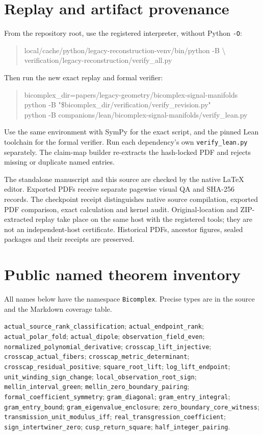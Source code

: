 \documentclass[11pt]{article}
\begin{document}
\section{Replay and artifact provenance}
From the repository root, use the registered interpreter, without Python
\texttt{-O}:
\begin{quote}\small\ttfamily
local/cache/python/legacy-reconstruction-venv/bin/python -B \textbackslash\\
verification/legacy-reconstruction/verify\_all.py
\end{quote}
Then run the new exact replay and formal verifier:
\begin{quote}\small\ttfamily
bicomplex\_dir=papers/legacy-geometry/bicomplex-signal-manifolds\\
python -B "\$bicomplex\_dir/verification/verify\_revision.py"\\[3pt]
python -B companions/lean/bicomplex-signal-manifolds/verify\_lean.py
\end{quote}
Use the same environment with SymPy for the exact script, and the pinned
Lean toolchain for the formal verifier. Run each dependency's own
\texttt{verify\_lean.py} separately. The claim-map builder re-extracts the
hash-locked PDF and rejects missing or duplicate named entries.

The standalone manuscript and this source are checked by the native LaTeX
editor. Exported PDFs receive separate pagewise visual QA and SHA-256 records.
The checkpoint receipt distinguishes native source compilation, exported
PDF comparison, exact calculation and kernel audit. Original-location and
ZIP-extracted replay take place on the same host with the registered tools;
they are not an independent-host certificate. Historical PDFs, ancestor
figures, sealed packages and their receipts are preserved.

\appendix\section{Public named theorem inventory}
All names below have the namespace \texttt{Bicomplex}. Precise types are in
the source and the Markdown coverage table.
\begin{flushleft}\small
\nolinkurl{actual_source_rank_classification};
\nolinkurl{actual_endpoint_rank}; \nolinkurl{actual_polar_fold};
\nolinkurl{actual_dipole}; \nolinkurl{observation_field_even};
\nolinkurl{normalized_polynomial_derivative};
\nolinkurl{crosscap_lift_injective}; \nolinkurl{crosscap_actual_fibers};
\nolinkurl{crosscap_metric_determinant}; \nolinkurl{crosscap_residual_positive};
\nolinkurl{square_root_lift}; \nolinkurl{log_lift_endpoint};
\nolinkurl{unit_winding_sign_change}; \nolinkurl{local_observation_root_sign};
\nolinkurl{mellin_interval_green}; \nolinkurl{mellin_zero_boundary_pairing};
\nolinkurl{formal_coefficient_symmetry}; \nolinkurl{gram_diagonal};
\nolinkurl{gram_entry_integral}; \nolinkurl{gram_entry_bound};
\nolinkurl{gram_eigenvalue_enclosure}; \nolinkurl{zero_boundary_core_witness};
\nolinkurl{transmission_unit_modulus_iff}; \nolinkurl{real_transgression_coefficient};
\nolinkurl{sign_intertwiner_zero}; \nolinkurl{cusp_return_square};
\nolinkurl{half_integer_pairing}.
\end{flushleft}
\end{document}
